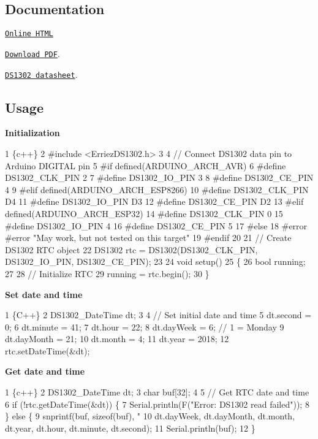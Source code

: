 \subsection*{Documentation}


\begin{DoxyItemize}
\item \href{https://erriez.github.io/ErriezDS1302}{\tt Online H\+T\+ML}
\item \href{https://github.com/Erriez/ErriezDS1302/raw/gh-pages/latex/ErriezDS1302.pdf}{\tt Download P\+DF}.
\item \href{https://www.google.com/search?q=DS1302+datasheet}{\tt D\+S1302 datasheet}.
\end{DoxyItemize}

\subsection*{Usage}

{\bfseries Initialization}


\begin{DoxyCode}
1 \{c++\}
2 #include <ErriezDS1302.h>
3 
4 // Connect DS1302 data pin to Arduino DIGITAL pin
5 #if defined(ARDUINO\_ARCH\_AVR)
6 #define DS1302\_CLK\_PIN      2
7 #define DS1302\_IO\_PIN       3
8 #define DS1302\_CE\_PIN       4
9 #elif defined(ARDUINO\_ARCH\_ESP8266)
10 #define DS1302\_CLK\_PIN      D4
11 #define DS1302\_IO\_PIN       D3
12 #define DS1302\_CE\_PIN       D2
13 #elif defined(ARDUINO\_ARCH\_ESP32)
14 #define DS1302\_CLK\_PIN      0
15 #define DS1302\_IO\_PIN       4
16 #define DS1302\_CE\_PIN       5
17 #else
18 #error #error "May work, but not tested on this target"
19 #endif
20 
21 // Create DS1302 RTC object
22 DS1302 rtc = DS1302(DS1302\_CLK\_PIN, DS1302\_IO\_PIN, DS1302\_CE\_PIN);
23 
24 void setup()
25 \{
26     bool running;
27 
28     // Initialize RTC
29     running = rtc.begin();
30 \}
\end{DoxyCode}


{\bfseries Set date and time}


\begin{DoxyCode}
1 \{C++\}
2 DS1302\_DateTime dt;
3 
4 // Set initial date and time
5 dt.second = 0;
6 dt.minute = 41;
7 dt.hour = 22;
8 dt.dayWeek = 6; // 1 = Monday
9 dt.dayMonth = 21;
10 dt.month = 4;
11 dt.year = 2018;
12 rtc.setDateTime(&dt);
\end{DoxyCode}


{\bfseries Get date and time}


\begin{DoxyCode}
1 \{c++\}
2 DS1302\_DateTime dt;
3 char buf[32];
4 
5 // Get RTC date and time
6 if (!rtc.getDateTime(&dt)) \{
7     Serial.println(F("Error: DS1302 read failed"));
8 \} else \{
9     snprintf(buf, sizeof(buf), "%
10              dt.dayWeek, dt.dayMonth, dt.month, dt.year, dt.hour, dt.minute, dt.second);
11     Serial.println(buf);
12 \}
\end{DoxyCode}


